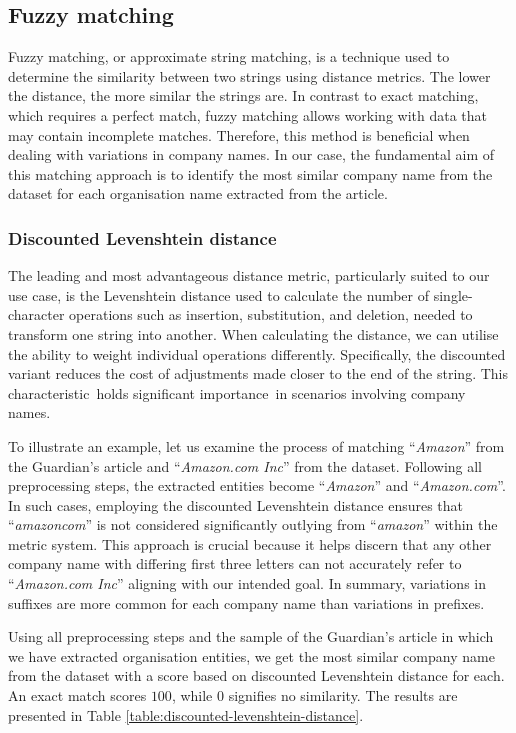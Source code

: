 \subsection{Fuzzy matching}
\label{subsec:fuzzy-matching}
Fuzzy matching, or approximate string matching, is a technique used to determine the similarity between two strings using distance metrics. The lower the distance, the more similar the strings are. In contrast to exact matching, which requires a perfect match, fuzzy matching allows working with data that may contain incomplete matches. Therefore, this method is beneficial when dealing with variations in company names. In our case, the fundamental aim of this matching approach is to identify the most similar company name from the dataset for each organisation name extracted from the article.

\subsubsection*{Discounted Levenshtein distance}
\label{subsubsec:levenshtein-distance}
The leading and most advantageous distance metric, particularly suited to our use case, is the Levenshtein distance \parencite{levenshtein1966binary} used to calculate the number of single-character operations such as insertion, substitution, and deletion, needed to transform one string into another. When calculating the distance, we can utilise the ability to weight individual operations differently. Specifically, the discounted variant reduces the cost of adjustments made closer to the end of the string. This characteristic holds significant importance in scenarios involving company names.

To illustrate an example, let us examine the process of matching ``\textit{Amazon}'' from the Guardian's article and ``\textit{Amazon.com Inc}'' from the dataset. Following all preprocessing steps, the extracted entities become ``\textit{Amazon}'' and ``\textit{Amazon.com}''. In such cases, employing the discounted Levenshtein distance ensures that ``\textit{amazoncom}'' is not considered significantly outlying from ``\textit{amazon}'' within the metric system. This approach is crucial because it helps discern that any other company name with differing first three letters can not accurately refer to ``\textit{Amazon.com Inc}'' aligning with our intended goal. In summary, variations in suffixes are more common for each company name than variations in prefixes. 

Using all preprocessing steps and the sample of the Guardian's article in which we have extracted organisation entities, we get the most similar company name from the dataset with a score based on discounted Levenshtein distance for each. An exact match scores $100$, while $0$ signifies no similarity. The results are presented in Table \ref{table:discounted-levenshtein-distance}.

